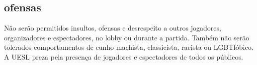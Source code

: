 \subsection{ofensas}

Não serão permitidos insultos, ofensas e desrespeito a outros jogadores, organizadores e espectadores, no lobby ou durante a partida. Também não serão tolerados comportamentos de cunho machista, classicista, racista ou LGBTfóbico. A UESL preza pela presença de jogadores e espectadores de todos os públicos.
